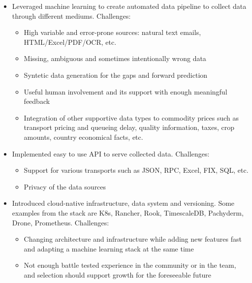 \documentclass[line, margin]{res}
\begin{document}
\begin{resume}
\vspace{-0.3cm}
\begin{itemize} \itemsep -5pt
	\item{Leveraged machine learning to create automated data pipeline to collect data through different mediums. Challenges:}
		\begin{itemize} \itemsep -5pt \small
		\vspace{-.2cm}
		\item High variable and error-prone sources: natural text emails, HTML/Excel/PDF/OCR, etc.
		\item Missing, ambiguous and sometimes intentionally wrong data 
		\item Syntetic data generation for the gaps and forward prediction
		\item Useful human involvement and its support with enough meaningful feedback
		\item Integration of other supportive data types to commodity prices such as transport pricing and queueing delay, quality information, taxes, crop amounts, country economical facts, etc.
		\end{itemize}
		
	\item{Implemented easy to use API to serve collected data. Challenges:}
		\begin{itemize} \itemsep -5pt \small
		\vspace{-.2cm}
		\item Support for various transports such as JSON, RPC, Excel, FIX, SQL, etc.
		\item Privacy of the data sources
		\end{itemize}
		
	\item{Introduced cloud-native infrastructure, data system and versioning. Some examples from the stack are K8s, Rancher, Rook, TimescaleDB, Pachyderm, Drone, Prometheus. Challenges:}
		\begin{itemize} \itemsep -5pt \small
		\vspace{-.2cm}
		\item Changing architecture and infrastructure while adding new features fast and adapting a machine learning stack at the same time
		\item Not enough battle tested experience in the community or in the team, and selection should support growth for the foreseeable future
		\end{itemize}			


\end{itemize}
\end{resume}
\end{document}
